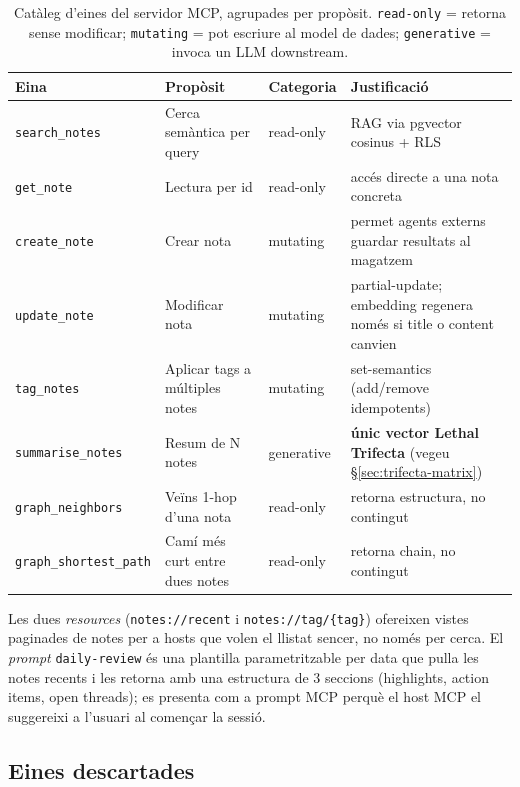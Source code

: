 \begin{table}[H]
    \centerfloat
    \footnotesize
    \caption{Catàleg d'eines del servidor MCP, agrupades per propòsit. \texttt{read-only} = retorna sense modificar; \texttt{mutating} = pot escriure al model de dades; \texttt{generative} = invoca un LLM downstream.}
    \label{tab:catàleg-tools}
    \begin{tabular}{@{}lll>{\raggedright\arraybackslash}p{6cm}@{}}
        \toprule
        Eina & Propòsit & Categoria & Justificació \\
        \midrule
        \texttt{search\_notes} & Cerca semàntica per query & read-only & RAG via pgvector cosinus + RLS \\
        \texttt{get\_note} & Lectura per id & read-only & accés directe a una nota concreta \\
        \texttt{create\_note} & Crear nota & mutating & permet agents externs guardar resultats al magatzem \\
        \texttt{update\_note} & Modificar nota & mutating & partial-update; embedding regenera només si title o content canvien \\
        \texttt{tag\_notes} & Aplicar tags a múltiples notes & mutating & set-semantics (add/remove idempotents) \\
        \texttt{summarise\_notes} & Resum de N notes & generative & \textbf{únic vector Lethal Trifecta} (vegeu \S\ref{sec:trifecta-matrix}) \\
        \texttt{graph\_neighbors} & Veïns 1-hop d'una nota & read-only & retorna estructura, no contingut \\
        \texttt{graph\_shortest\_path} & Camí més curt entre dues notes & read-only & retorna chain, no contingut \\
        \bottomrule
    \end{tabular}
\end{table}

Les dues \emph{resources} (\texttt{notes://recent} i \texttt{notes://tag/\{tag\}}) ofereixen vistes paginades de notes per a hosts que volen el llistat sencer, no només per cerca. El \emph{prompt} \texttt{daily-review} és una plantilla parametritzable per data que pulla les notes recents i les retorna amb una estructura de 3 seccions (highlights, action items, open threads); es presenta com a prompt MCP perquè el host MCP el suggereixi a l'usuari al començar la sessió.

\subsection{Eines descartades}

